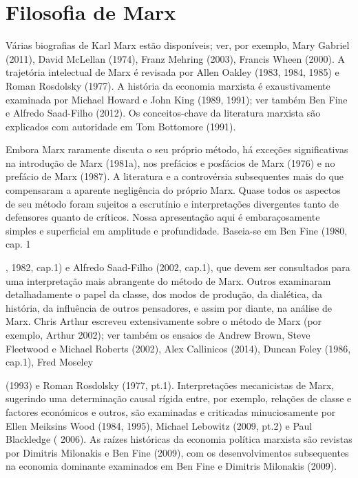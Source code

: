 \section{Filosofia de Marx}
 \par 
Várias biografias de Karl Marx estão disponíveis; ver, por exemplo, Mary Gabriel (2011), David McLellan (1974), Franz Mehring (2003), Francis Wheen (2000). A trajetória intelectual de Marx é revisada por Allen Oakley (1983, 1984, 1985) e Roman Rosdolsky (1977). A história da economia marxista é exaustivamente examinada por Michael Howard e John King (1989, 1991); ver também Ben Fine e Alfredo Saad-Filho (2012). Os conceitos-chave da literatura marxista são explicados com autoridade em Tom Bottomore (1991).
 \par 
Embora Marx raramente discuta o seu próprio método, há exceções significativas na introdução de Marx (1981a), nos prefácios e posfácios de Marx (1976) e no prefácio de Marx (1987). A literatura e a controvérsia subsequentes mais do que compensaram a aparente negligência do próprio Marx. Quase todos os aspectos de seu método foram sujeitos a escrutínio e interpretações divergentes tanto de defensores quanto de críticos. Nossa apresentação aqui é embaraçosamente simples e superficial em amplitude e profundidade. Baseia-se em Ben Fine (1980, cap. {\color{blue} 1 } {\par} , 1982, cap.{\color{blue}1}) e Alfredo Saad-Filho (2002, cap.{\color{blue}1}), que devem ser consultados para uma interpretação mais abrangente do método de Marx. Outros examinaram detalhadamente o papel da classe, dos modos de produção, da dialética, da história, da influência de outros pensadores, e assim por diante, na análise de Marx. Chris Arthur escreveu extensivamente sobre o método de Marx (por exemplo, Arthur 2002); ver também os ensaios de Andrew Brown, Steve Fleetwood e Michael Roberts (2002), Alex Callinicos (2014), Duncan Foley (1986, cap.{\color{blue}1}), Fred Moseley
 \par 
(1993) e Roman Rosdolsky (1977, pt.{\color{blue}1}). Interpretações mecanicistas de Marx, sugerindo uma determinação causal rígida entre, por exemplo, relações de classe e factores económicos e outros, são examinadas e criticadas minuciosamente por Ellen Meiksins Wood (1984, 1995), Michael Lebowitz (2009, pt.{\color{blue}2}) e Paul Blackledge ( 2006). As raízes históricas da economia política marxista são revistas por Dimitris Milonakis e Ben Fine (2009), com os desenvolvimentos subsequentes na economia dominante examinados em Ben Fine e Dimitris Milonakis (2009).